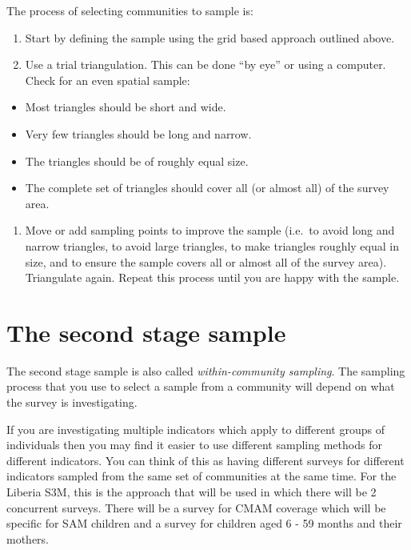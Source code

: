 \documentclass[12pt,a4paper]{book}
\providecommand{\tightlist}{%
  \setlength{\itemsep}{0pt}\setlength{\parskip}{0pt}}
\theoremstyle{definition}
\theoremstyle{definition}
\theoremstyle{definition}
\theoremstyle{remark}
\begin{document}
The process of selecting communities to sample is:

\begin{enumerate}
\def\labelenumi{\arabic{enumi}.}
\item
  Start by defining the sample using the grid based approach outlined
  above.
\item
  Use a trial triangulation. This can be done ``by eye'' or using a
  computer. Check for an even spatial sample:
\end{enumerate}

\begin{itemize}
\item
  Most triangles should be short and wide.
\item
  Very few triangles should be long and narrow.
\item
  The triangles should be of roughly equal size.
\item
  The complete set of triangles should cover all (or almost all) of the
  survey area.
\end{itemize}

\begin{enumerate}
\def\labelenumi{\arabic{enumi}.}
\setcounter{enumi}{2}
\tightlist
\item
  Move or add sampling points to improve the sample (i.e.~to avoid long
  and narrow triangles, to avoid large triangles, to make triangles
  roughly equal in size, and to ensure the sample covers all or almost
  all of the survey area). Triangulate again. Repeat this process until
  you are happy with the sample.
\end{enumerate}

\hypertarget{stage2}{%
\section{The second stage sample}\label{stage2}}

The second stage sample is also called \emph{within-community sampling}.
The sampling process that you use to select a sample from a community
will depend on what the survey is investigating.

If you are investigating multiple indicators which apply to different
groups of individuals then you may find it easier to use different
sampling methods for different indicators. You can think of this as
having different surveys for different indicators sampled from the same
set of communities at the same time. For the Liberia S3M, this is the
approach that will be used in which there will be 2 concurrent surveys.
There will be a survey for CMAM coverage which will be specific for SAM
children and a survey for children aged 6 - 59 months and their mothers.
\end{document}
